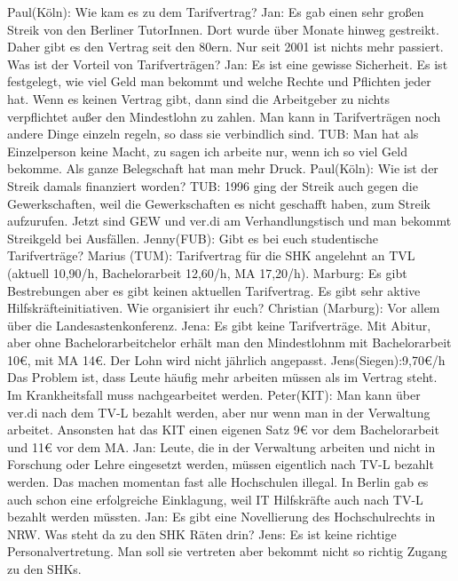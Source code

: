 \begin{outline}
      \1 Paul(Köln): Wie kam es zu dem Tarifvertrag?
          \2 Jan: Es gab einen sehr großen Streik von den Berliner TutorInnen. Dort wurde über Monate hinweg gestreikt. Daher gibt es den Vertrag seit den 80ern. Nur seit 2001 ist nichts mehr passiert.
      \1 Was ist der Vorteil von Tarifverträgen?
          \2 Jan: Es ist eine gewisse Sicherheit. Es ist festgelegt, wie viel Geld man bekommt und welche Rechte und Pflichten jeder hat. Wenn es keinen Vertrag gibt, dann sind die Arbeitgeber zu nichts verpflichtet außer den Mindestlohn zu zahlen. Man kann in Tarifverträgen noch andere Dinge einzeln regeln, so dass sie verbindlich sind.
          \2 TUB: Man hat als Einzelperson keine Macht, zu sagen ich arbeite nur, wenn ich so viel Geld bekomme. Als ganze Belegschaft hat man mehr Druck.
      \1 Paul(Köln): Wie ist der Streik damals finanziert worden?
          \2 TUB: 1996 ging der Streik auch gegen die Gewerkschaften, weil die Gewerkschaften es nicht geschafft haben, zum Streik aufzurufen. Jetzt sind GEW und ver.di am Verhandlungstisch und man bekommt Streikgeld bei Ausfällen.
      \1 Jenny(FUB): Gibt es bei euch studentische Tarifverträge?
          \2 Marius (TUM): Tarifvertrag für die SHK angelehnt an TVL (aktuell 10,90/h, Bachelorarbeit 12,60/h, MA 17,20/h).
          \2 Marburg: Es gibt Bestrebungen aber es gibt keinen aktuellen Tarifvertrag. Es gibt sehr aktive Hilfskräfteinitiativen.
      \1 Wie organisiert ihr euch?
          \2 Christian (Marburg): Vor allem über die Landesastenkonferenz.
          \2 Jena: Es gibt keine Tarifverträge. Mit Abitur, aber ohne Bachelorarbeitchelor erhält man den Mindestlohnm mit Bachelorarbeit 10€, mit MA 14€. Der Lohn wird nicht jährlich angepasst.
          \2 Jens(Siegen):9,70€/h Das Problem ist, dass Leute häufig mehr arbeiten müssen als im Vertrag steht. Im Krankheitsfall muss nachgearbeitet werden.
          \2 Peter(KIT): Man kann über ver.di nach dem TV-L bezahlt werden, aber nur wenn man in der Verwaltung arbeitet. Ansonsten hat das KIT einen eigenen Satz 9€ vor dem Bachelorarbeit und 11€ vor dem MA.
          \2 Jan: Leute, die in der Verwaltung arbeiten und nicht in Forschung oder Lehre eingesetzt werden, müssen eigentlich nach TV-L bezahlt werden. Das machen momentan fast alle Hochschulen illegal. In Berlin gab es auch schon eine erfolgreiche Einklagung, weil IT Hilfskräfte auch nach TV-L bezahlt werden müssten.
      \1 Jan: Es gibt eine Novellierung des Hochschulrechts in NRW. Was steht da zu den SHK Räten drin?
          \2 Jens: Es ist keine richtige Personalvertretung. Man soll sie vertreten aber bekommt nicht so richtig Zugang zu den SHKs.

\end{outline}
